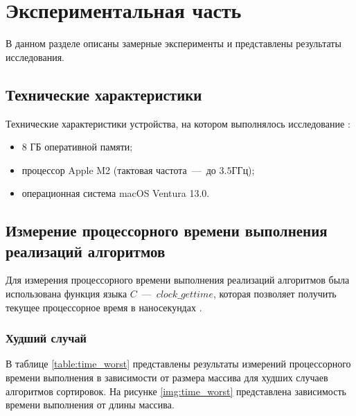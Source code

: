 \chapter{Экспериментальная часть}

В данном разделе описаны замерные эксперименты и представлены результаты исследования.

\section{Технические характеристики}
Технические характеристики устройства, на котором выполнялось исследование \cite{bib:5}:
\begin{itemize}
	\item 8 ГБ оперативной памяти;
	\item процессор Apple M2 (тактовая частота~---~до $3.5$ГГц);
    \item операционная система macOS Ventura 13.0.
\end{itemize}

\section{Измерение процессорного времени выполнения реализаций алгоритмов}

Для измерения процессорного времени выполнения реализаций алгоритмов была использована функция языка $C$~---~$clock\_gettime$, которая позволяет получить текущее процессорное время в наносекундах \cite{bib:6}.

\subsection{Худший случай}

В таблице \ref{table:time_worst} представлены результаты измерений процессорного времени выполнения в зависимости от размера массива для худших случаев алгоритмов сортировок. На рисунке \ref{img:time_worst} представлена зависимость времени выполнения от длины массива.

